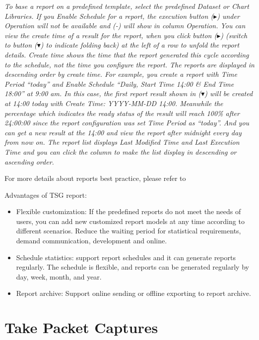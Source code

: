 \notemark\textit{To base a report on a predefined template, select the predefined Dataset or Chart Libraries.
If you Enable Schedule for a report, the execution button (\mbox{$\blacktriangleright$}) under Operation will not be available and (-) will show in column Operation. 
You can view the create time of a result for the report, when you click button (\mbox{$\blacktriangleright$}) 
(switch to button (\mbox{$\blacktriangledown$}) to indicate folding back) at the left of a row to unfold the report details. 
Create time shows the time that the report generated this cycle according to the schedule, not the time you configure the report. 
The reports are displayed in descending order by create time. For example, you create a report with Time Period “today” 
and Enable Schedule “Daily, Start Time 14:00 \& End Time 18:00” at 9:00 am. In this case, the first report 
result shown in (\mbox{$\blacktriangledown$}) will be created at 14:00 today with Create Time: YYYY-MM-DD 14:00. 
Meanwhile the percentage which indicates the ready status of the result will reach 100\% after 24:00:00 since the report configuration was set Time Period as “today”. 
And you can get a new result at the 14:00 and view the report after midnight every day from now on. 
The report list displays Last Modified Time and Last Execution Time and you can click the column to make the list display in descending or ascending order.} 


For more details about reports best practice, please refer to \hyperlink{link:Make Your Own Reports}{\color{linkblue}{Appendix E Make Your Own Reports}}


Advantages of TSG report: 
\begin{itemize}
    \item Flexible customization: If the predefined reports do not meet the needs of users, you can add new customized report models at any time according to different scenarios. Reduce the waiting period for statistical requirements, demand communication, development and online. 
    \item Schedule statistics: support report schedules and it can generate reports regularly. The schedule is flexible, and reports can be generated regularly by day, week, month, and year.
    \item Report archive: Support online sending or offline exporting to report archive.
\end{itemize}

\section*{\hypertarget{link:Take Packet Captures}{Take Packet Captures}}
\label{sec:monitor:packet}


